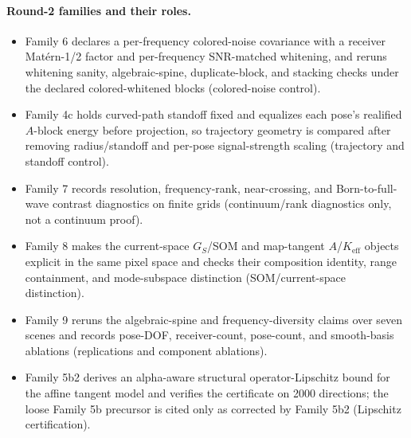\documentclass[12pt]{article}
\begin{document}
\paragraph{Round-2 families and their roles.}
\begin{itemize}
\item Family 6 declares a per-frequency colored-noise covariance with a
receiver Mat\'ern-1/2 factor and per-frequency SNR-matched whitening, and
reruns whitening sanity, algebraic-spine, duplicate-block, and stacking
checks under the declared colored-whitened blocks (colored-noise control).
\item Family 4c holds curved-path standoff fixed and equalizes each pose's
realified $A$-block energy before projection, so trajectory geometry is
compared after removing radius/standoff and per-pose signal-strength scaling
(trajectory and standoff control).
\item Family 7 records resolution, frequency-rank, near-crossing, and
Born-to-full-wave contrast diagnostics on finite grids (continuum/rank
diagnostics only, not a continuum proof).
\item Family 8 makes the current-space $G_S$/SOM and map-tangent
$A$/$K_{\mathrm{eff}}$ objects explicit in the same pixel space and checks
their composition identity, range containment, and mode-subspace distinction
(SOM/current-space distinction).
\item Family 9 reruns the algebraic-spine and frequency-diversity claims over
seven scenes and records pose-DOF, receiver-count, pose-count, and
smooth-basis ablations (replications and component ablations).
\item Family 5b2 derives an alpha-aware structural operator-Lipschitz bound
for the affine tangent model and verifies the certificate on 2000 directions;
the loose Family 5b precursor is cited only as corrected by Family 5b2
(Lipschitz certification).
\end{itemize}
\end{document}
